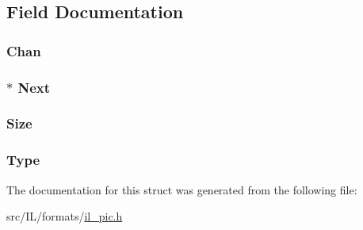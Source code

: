 \subsection{Field Documentation}
\hypertarget{struct_c_h_a_n_n_e_l_ae44098b3d3a91bde7de7a361357d508a}{
\subsubsection[{Chan}]{ Chan}}\label{struct_c_h_a_n_n_e_l_ae44098b3d3a91bde7de7a361357d508a}
\hypertarget{struct_c_h_a_n_n_e_l_a9c1fb6e887705cb28e8f5bdfa05d25f8}{
\subsubsection[{Next}]{$\ast$ Next}}\label{struct_c_h_a_n_n_e_l_a9c1fb6e887705cb28e8f5bdfa05d25f8}
\hypertarget{struct_c_h_a_n_n_e_l_ae8bccc7d768ed759ff64c0fc9c07591b}{
\subsubsection[{Size}]{ Size}}\label{struct_c_h_a_n_n_e_l_ae8bccc7d768ed759ff64c0fc9c07591b}
\hypertarget{struct_c_h_a_n_n_e_l_a53459c6382c3de0c1ce53e9812531da6}{
\subsubsection[{Type}]{ Type}}\label{struct_c_h_a_n_n_e_l_a53459c6382c3de0c1ce53e9812531da6}


The documentation for this struct was generated from the following file\-:\begin{DoxyCompactItemize}
\item 
src/\-I\-L/formats/\hyperlink{il__pic_8h}{il\-\_\-pic.\-h}\end{DoxyCompactItemize}
